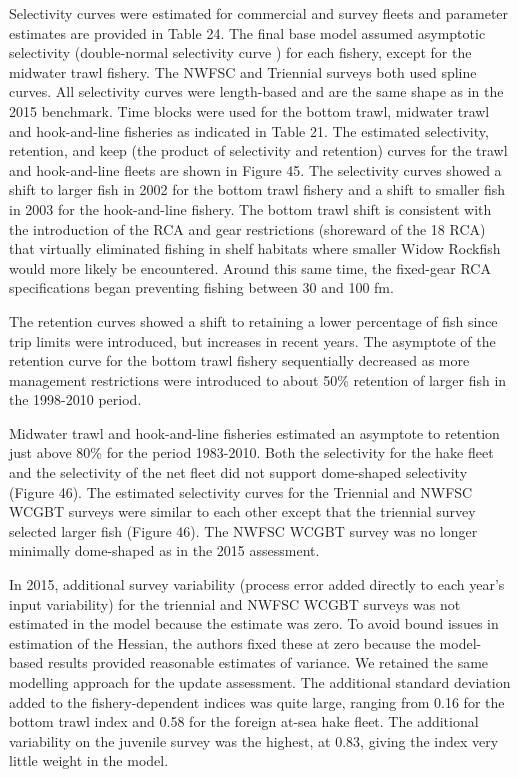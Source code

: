 \documentclass[
]{scrartcl}
\begin{document}
Selectivity curves were estimated for commercial and survey fleets and
parameter estimates are provided in Table 24. The final base model
assumed asymptotic selectivity (double-normal selectivity curve ) for
each fishery, except for the midwater trawl fishery. The NWFSC and
Triennial surveys both used spline curves. All selectivity curves were
length-based and are the same shape as in the 2015 benchmark. Time
blocks were used for the bottom trawl, midwater trawl and hook-and-line
fisheries as indicated in Table 21. The estimated selectivity,
retention, and keep (the product of selectivity and retention) curves
for the trawl and hook-and-line fleets are shown in Figure 45. The
selectivity curves showed a shift to larger fish in 2002 for the bottom
trawl fishery and a shift to smaller fish in 2003 for the hook-and-line
fishery. The bottom trawl shift is consistent with the introduction of
the RCA and gear restrictions (shoreward of the 18 RCA) that virtually
eliminated fishing in shelf habitats where smaller Widow Rockfish would
more likely be encountered. Around this same time, the fixed-gear RCA
specifications began preventing fishing between 30 and 100 fm.

The retention curves showed a shift to retaining a lower percentage of
fish since trip limits were introduced, but increases in recent years.
The asymptote of the retention curve for the bottom trawl fishery
sequentially decreased as more management restrictions were introduced
to about 50\% retention of larger fish in the 1998-2010 period.

Midwater trawl and hook-and-line fisheries estimated an asymptote to
retention just above 80\% for the period 1983-2010. Both the selectivity
for the hake fleet and the selectivity of the net fleet did not support
dome-shaped selectivity (Figure 46). The estimated selectivity curves
for the Triennial and NWFSC WCGBT surveys were similar to each other
except that the triennial survey selected larger fish (Figure 46). The
NWFSC WCGBT survey was no longer minimally dome-shaped as in the 2015
assessment.

In 2015, additional survey variability (process error added directly to
each year's input variability) for the triennial and NWFSC WCGBT surveys
was not estimated in the model because the estimate was zero. To avoid
bound issues in estimation of the Hessian, the authors fixed these at
zero because the model- based results provided reasonable estimates of
variance. We retained the same modelling approach for the update
assessment. The additional standard deviation added to the
fishery-dependent indices was quite large, ranging from 0.16 for the
bottom trawl index and 0.58 for the foreign at-sea hake fleet. The
additional variability on the juvenile survey was the highest, at 0.83,
giving the index very little weight in the model.
\end{document}
